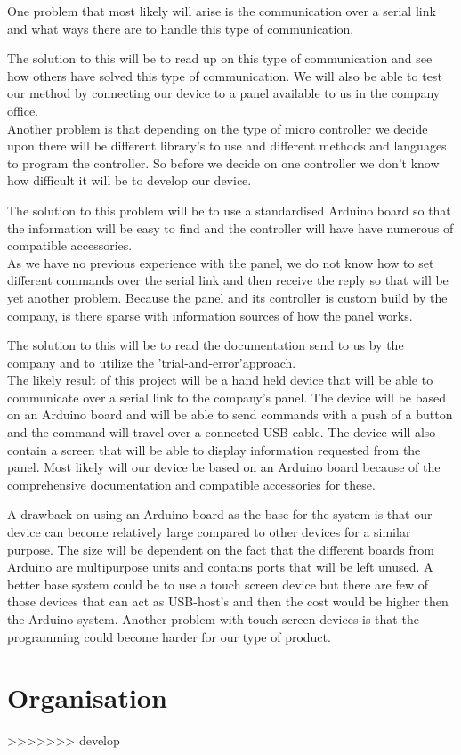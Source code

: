 \documentclass[a4paper]{article}
\begin{document}
    \noindent One problem that most likely will arise is the communication over a serial link and what ways there are to handle this type of communication.

    The solution to this will be to read up on this type of communication and see how others have solved this type of communication. We will also be able to test our method by connecting our device to a panel available to us in the company office.\\

    \noindent Another problem is that depending on the type of micro controller we decide upon there will be different library's to use and different methods and languages to program the controller. So before we decide on one controller we don't know how difficult it will be to develop our device.

    The solution to this problem will be to use a standardised Arduino board so that the information will be easy to find and the controller will have have numerous of compatible accessories. \\

    \noindent As we have no previous experience with the panel, we do not know how to set different commands over the serial link and then receive the reply so that will be yet another problem. Because the panel and its controller is custom build by the company, is there sparse with information sources of how the panel works.

    The solution to this will be to read the documentation send to us by the company and to utilize the 'trial-and-error'approach. \\

    \noindent The likely result of this project will be a hand held device that will be able to communicate over a serial link to the company's panel. The device will be based on an Arduino board and will be able to send commands with a push of a button and the command will travel over a connected USB-cable. The device will also contain a screen that will be able to display information requested from the panel. Most likely will our device be based on an Arduino board because of the comprehensive documentation and compatible accessories for these.

    A drawback on using an Arduino board as the base for the system is that our device can become relatively large compared to other devices for a similar purpose. The size will be dependent on the fact that the different boards from Arduino are multipurpose units and contains ports that will be left unused. A better base system could be to use a touch screen device but there are few of those devices that can act as USB-host's and then the cost would be higher then the Arduino system. Another problem with touch screen devices is that the programming could become harder for our type of product.


    \section*{Organisation} %
    \label{sec:organisation}
    
>>>>>>> develop
\end{document}
